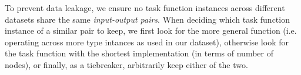 \documentclass{article} %
\begin{document}







To prevent data leakage, we ensure no task function instances across different datasets share the same \emph{input-output pairs}.
When deciding which task function instance of a similar pair to keep,
we first look for the more general function (i.e. operating across more type intances as used in our dataset),
otherwise look for the task function with the shortest implementation (in terms of number of nodes),
or finally, as a tiebreaker, arbitrarily keep either of the two.
\end{document}
